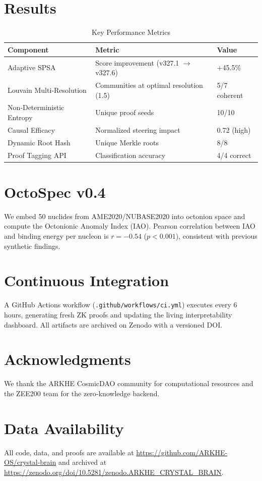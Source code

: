 \documentclass[12pt,a4paper]{article}
\begin{document}
\section{Results}
\begin{table}[h]
\centering
\caption{Key Performance Metrics}
\begin{tabular}{@{}lll@{}}
\toprule
\textbf{Component} & \textbf{Metric} & \textbf{Value} \\
\midrule
Adaptive SPSA & Score improvement (v327.1 $\rightarrow$ v327.6) & +45.5\% \\
Louvain Multi‑Resolution & Communities at optimal resolution (1.5) & 5/7 coherent \\
Non‑Deterministic Entropy & Unique proof seeds & 10/10 \\
Causal Efficacy & Normalized steering impact & 0.72 (high) \\
Dynamic Root Hash & Unique Merkle roots & 8/8 \\
Proof Tagging API & Classification accuracy & 4/4 correct \\
\bottomrule
\end{tabular}
\end{table}

\section{OctoSpec v0.4}
We embed 50 nuclides from AME2020/NUBASE2020 into octonion space and compute the Octonionic Anomaly Index (IAO). Pearson correlation between IAO and binding energy per nucleon is $r=-0.54$ ($p<0.001$), consistent with previous synthetic findings.

\section{Continuous Integration}
A GitHub Actions workflow (\texttt{.github/workflows/ci.yml}) executes every 6 hours, generating fresh ZK proofs and updating the living interpretability dashboard. All artifacts are archived on Zenodo with a versioned DOI.

\section*{Acknowledgments}
We thank the ARKHE CosmicDAO community for computational resources and the ZEE200 team for the zero‑knowledge backend.

\section*{Data Availability}
All code, data, and proofs are available at \url{https://github.com/ARKHE-OS/crystal-brain} and archived at \url{https://zenodo.org/doi/10.5281/zenodo.ARKHE\_CRYSTAL\_BRAIN}.
\end{document}
